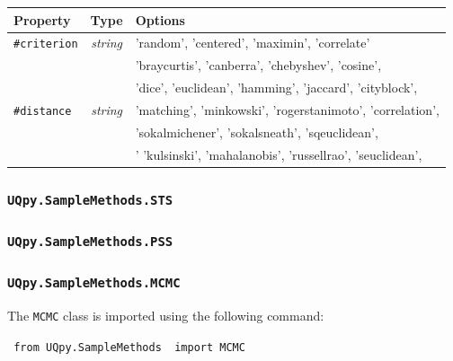 \begin{center}
	\begin{tabular}{ |l|c|l| } 
		\hline
		\textbf{Property} & \textbf{Type} & \textbf{Options} \\
		\hline
		\texttt{\#criterion}& \textit{string} &  'random', 'centered', 'maximin', 'correlate'  \\ 
		\hline
		\multirow{5}{*}{\texttt{\#distance}} & \multirow{5}{*}{\textit{string}} & 'braycurtis', 'canberra', 'chebyshev', 'cosine', \\ 
		&  &  'dice', 'euclidean', 'hamming', 'jaccard',  'cityblock',   \\ 
		&  &  'matching', 'minkowski', 'rogerstanimoto',  'correlation', \\ 
		&  & 'sokalmichener', 'sokalsneath', 'sqeuclidean',  \\ 
		&  & ' 'kulsinski', 'mahalanobis', 'russellrao', 'seuclidean',  \\ 
		\hline
	\end{tabular}
\end{center}


\subsubsection{\texttt{UQpy.SampleMethods.STS}}


\subsubsection{\texttt{UQpy.SampleMethods.PSS}}


\subsubsection{\texttt{UQpy.SampleMethods.MCMC}}
\label{Sec:MCMC}

The \texttt{MCMC} class is imported using the following command:

\vspace{4mm}
\texttt{{\color{blue} from} \texttt{UQpy.SampleMethods} {\color{blue} import} MCMC}
\vspace{4mm}


